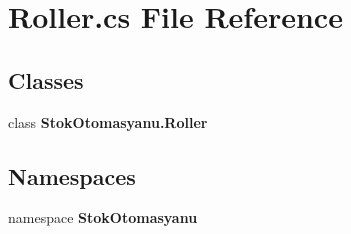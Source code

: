 \section{Roller.\+cs File Reference}
\label{_roller_8cs}
\subsection*{Classes}
\begin{DoxyCompactItemize}
\item 
class \textbf{ Stok\+Otomasyanu.\+Roller}
\end{DoxyCompactItemize}
\subsection*{Namespaces}
\begin{DoxyCompactItemize}
\item 
namespace \textbf{ Stok\+Otomasyanu}
\end{DoxyCompactItemize}
